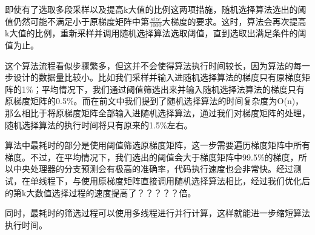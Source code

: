 即使有了选取多段采样以及提高k大值的比例这两项措施，随机选择算法选出的阈值仍然可能不满足小于原梯度矩阵中第$\frac{size}{1000}$大梯度的要求。这时，算法会再次提高k大值的比例，重新采样并调用随机选择算法选取阈值，直到选取出满足条件的阈值为止。

这个算法流程看似步骤繁多，但这并不会使得算法执行时间较长，因为算法的每一步设计的数据量比较小。比如我们采样并输入进随机选择算法的梯度只有原梯度矩阵的1\%；平均情况下，我们通过阈值筛选出来并输入随机选择法算法的梯度只有原梯度矩阵的0.5\%。而在前文中我们提到了随机选择算法的时间复杂度为O(n)，那么相比于将原梯度矩阵全部输入进随机选择算法，通过我们对梯度矩阵的处理，随机选择算法的执行时间将只有原来的1.5\%左右。

算法中最耗时的部分是使用阈值筛选原梯度矩阵，这一步需要遍历梯度矩阵中所有梯度。不过，在平均情况下，我们选出的阈值会大于梯度矩阵中99.5\%的梯度，所以中央处理器的分支预测会有极高的准确率，代码执行速度也会非常快。经过测试，在单线程下，与使用原梯度矩阵直接调用随机选择算法相比，经过我们优化后的第k大数值选择过程的速度提高了？？？？？倍。

同时，最耗时的筛选过程可以使用多线程进行并行计算，这样就能进一步缩短算法执行时间。